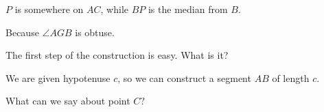 $P$ is somewhere on $AC$, while $BP$ is the median from $B$.


Because $\angle AGB$ is obtuse.

The first step of the construction is easy. What is it?


We are given hypotenuse $c$, so we can construct a segment $AB$ of length $c$.

What can we say about point $C?$















